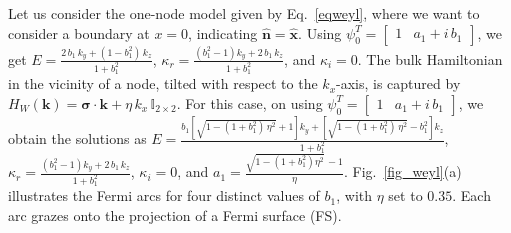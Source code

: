 \documentclass[aps,prl,twocolumn,nofootinbib,showkeys, nolongbibliography, 10pt]{revtex4-2}
\begin{document}
Let us consider the one-node model given by Eq.~\eqref{eqweyl}, where we want to consider a boundary at $x=0$, indicating $\boldsymbol{\hat n} = \boldsymbol{\hat x} $. Using $ \psi_0^T  = \begin{bmatrix}
1 & a_1 +i \, b_1 \end{bmatrix}$, we get $E = \frac{2 \,b_1\, k_y +(1- b_1^2)\, k_z} { 1 + b_1^2 }$, $\kappa_r = \frac{\left(b_1^2-1\right) k_y+2 \,b_1\, k_z} { 1 + b_1^2 } $, and $\kappa_i = 0$.
The bulk Hamiltonian in the vicinity of a node, tilted with respect to the $k_x$-axis, is captured by $ H_W (\mathbf k) = \boldsymbol{\sigma} \cdot {\mathbf k} + \eta\, k_x \, {\mathbb{I}}_{2\times 2}$.
For this case, on using $ \psi_0^T  = \begin{bmatrix}
1 & a_1 +i \, b_1 \end{bmatrix}$, we obtain the solutions as $E =  \frac{b_1 \left [\sqrt{1-\left( 1 + b_1^2 \right)\,
 \eta ^2}+1\right ] k_y+  \left[ \sqrt{1-\left( 1+ b_1^2 \right)\, \eta ^2}  - b_1^2 \right]
 k_z } { 1 + b_1^2} $, 
$\kappa_r  = \frac{\left(b_1^2-1\right) k_y+2 \,b_1\, k_z} { 1 + b_1^2} $, $\kappa_i = 0$, and $a_1 =
\frac{\sqrt{1-\left( 1 + b_1^2\right) \eta ^2} \, -1} {\eta }$.
Fig.~\ref{fig_weyl}(a) illustrates the Fermi arcs for four distinct values of $b_1$, with $\eta$ set to $0.35$. Each arc grazes onto the projection of a Fermi surface (FS).
 
 
\end{document}
